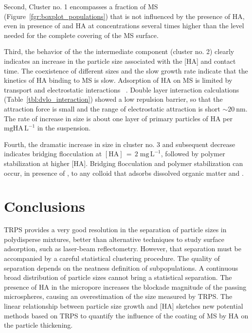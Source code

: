 \documentclass[journal=langd5,manuscript=article]{achemso}
\begin{document}
Second, Cluster no. 1 encompasses a fraction of MS (Figure~\ref{fgr:boxplot_populations}) that is not influenced by the presence of HA, even in presence of  and HA at concentrations several times higher than the level needed for the complete covering of the MS surface.


Third, the behavior of the the intermediate component (cluster no. 2) clearly indicates an increase in the particle size associated with the [HA] and
contact time. The coexistence of different sizes and the
slow  growth rate indicate that the kinetics of HA binding
to MS is slow. Adsorption of HA on MS is limited by
transport and electrostatic interactions~ \cite{doi:10.1021/es981236u}.
Double layer interaction calculations (Table~\ref{tbl:dvlo_interaction}) showed a low  repulsion barrier,
so that the attraction force is small and the range of electrostatic attraction is short $\sim 20~\mathrm{nm}$.
The rate of increase in size is about one  layer of primary particles of HA per $\mathrm{mg HA\,L^{-1}}$ in the suspension.

Fourth, the dramatic increase in size in cluster no. 3 
and subsequent decrease indicates bridging flocculation at 
$\mathrm{[HA] \,=\, 2\;mg\,L^{-1}}$, followed by polymer stabilization at higher [HA]. %
Bridging flocculation and polymer stabilization can occur, in presence of , to any colloid that adsorbs dissolved organic matter and .


\section{Conclusions}


TRPS provides a very good resolution in the separation  of particle sizes in polydisperse mixtures, better than alternative techniques to study surface adsorption, such as laser-beam reflectometry. However, that separation must be accompanied by a careful statistical clustering procedure. The quality of separation depends on the neatness definition of subpopulations. A continuous broad distribution of particle sizes cannot bring a statistical separation.
The presence of HA in the micropore increases the blockade magnitude of the passing microspheres, causing an overestimation of the size measured by TRPS.  The linear relationship  between particle size growth and [HA] sketches new potential methods based on TRPS to quantify the influence of the coating of MS by HA on the particle thickening.
\end{document}
